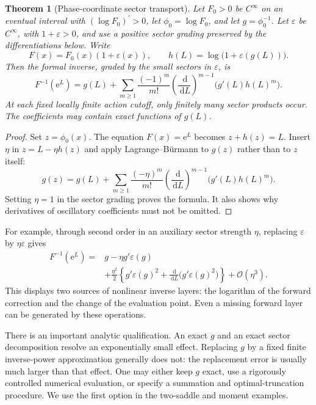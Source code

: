 \documentclass[11pt,a4paper]{article}
\numberwithin{equation}{section}
\newtheorem{theorem}{Theorem}[section]
\theoremstyle{definition}
\theoremstyle{remark}
\newcommand{\dd}{\,\mathrm d}
\newcommand{\ee}{\mathrm e}
\newcommand{\bigO}{\mathcal O}
\begin{document}
\begin{theorem}[Phase-coordinate sector transport]
\label{thm:transport}
Let $F_0>0$ be $C^\infty$ on an eventual interval with $(\log F_0)^{\prime}>0$, let $\phi_0=\log F_0$, and let $g=\phi_0^{-1}$. Let $\varepsilon$ be $C^\infty$, with $1+\varepsilon>0$, and use a positive sector grading preserved by the differentiations below. Write
\[
 F(x)=F_0(x)(1+\varepsilon(x)),\qquad
 h(L)=\log\bigl(1+\varepsilon(g(L))\bigr).
\]
Then the formal inverse, graded by the small sectors in $\varepsilon$, is
\begin{equation}
 F^{-1}(\ee^L)=g(L)+
 \sum_{m\ge1}\frac{(-1)^m}{m!}
 \left(\frac{\dd}{\dd L}\right)^{m-1}
       \bigl(g'(L)h(L)^m\bigr).
 \label{eq:transport}
\end{equation}
At each fixed locally finite action cutoff, only finitely many sector products occur. The coefficients may contain exact functions of $g(L)$.
\end{theorem}
\begin{proof}
Set $z=\phi_0(x)$. The equation $F(x)=\ee^L$ becomes $z+h(z)=L$. Insert $\eta$ in $z=L-\eta h(z)$ and apply Lagrange--B\"urmann to $g(z)$ rather than to $z$ itself:
\[
 g(z)=g(L)+\sum_{m\ge1}\frac{(-\eta)^m}{m!}
 \left(\frac{\dd}{\dd L}\right)^{m-1}\bigl(g'(L)h(L)^m\bigr).
\]
Setting $\eta=1$ in the sector grading proves the formula. It also shows why derivatives of oscillatory coefficients must not be omitted.
\end{proof}

For example, through second order in an auxiliary sector strength $\eta$, replacing $\varepsilon$ by $\eta\varepsilon$ gives
\begin{align}
 F^{-1}(\ee^L)
 ={}&g-\eta g'\varepsilon(g)\nonumber\\
 &+\frac{\eta^2}{2}\left\{g'\varepsilon(g)^2
       +\frac{\dd}{\dd L}\bigl(g'\varepsilon(g)^2\bigr)\right\}
       +\bigO(\eta^3).
 \label{eq:transport-second}
\end{align}
This displays two sources of nonlinear inverse layers: the logarithm of the forward correction and the change of the evaluation point. Even a missing forward layer can be generated by these operations.

There is an important analytic qualification. An exact $g$ and an exact sector decomposition resolve an exponentially small effect. Replacing $g$ by a fixed finite inverse-power approximation generally does not: the replacement error is usually much larger than that effect. One may either keep $g$ exact, use a rigorously controlled numerical evaluation, or specify a summation and optimal-truncation procedure. We use the first option in the two-saddle and moment examples.
\end{document}
